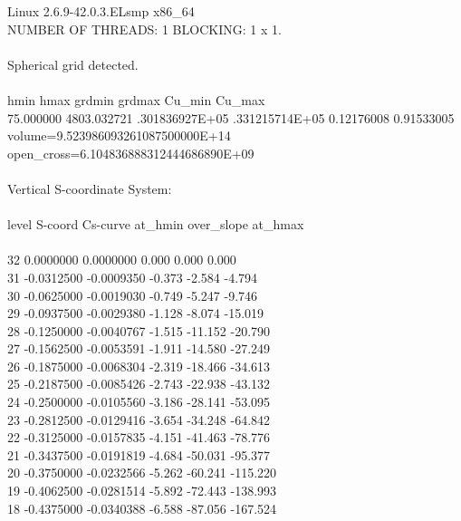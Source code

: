\noindent Linux 2.6.9-42.0.3.ELsmp x86\_64\\
NUMBER OF THREADS:  1 BLOCKING:  1 x  1.\\
\\
Spherical grid detected.\\
\\
hmin        hmax         grdmin         grdmax         Cu\_min      Cu\_max\\
75.000000  4803.032721 .301836927E+05 .331215714E+05  0.12176008  0.91533005\\
volume=9.523986093261087500000E+14   open\_cross=6.104836888312444686890E+09\\
\\
Vertical S-coordinate System:\\
\\
level   S-coord     Cs-curve          at\_hmin  over\_slope     at\_hmax\\
\\
32   0.0000000   0.0000000           0.000       0.000       0.000\\
31  -0.0312500  -0.0009350          -0.373      -2.584      -4.794\\
30  -0.0625000  -0.0019030          -0.749      -5.247      -9.746\\
29  -0.0937500  -0.0029380          -1.128      -8.074     -15.019\\
28  -0.1250000  -0.0040767          -1.515     -11.152     -20.790\\
27  -0.1562500  -0.0053591          -1.911     -14.580     -27.249\\
26  -0.1875000  -0.0068304          -2.319     -18.466     -34.613\\
25  -0.2187500  -0.0085426          -2.743     -22.938     -43.132\\
24  -0.2500000  -0.0105560          -3.186     -28.141     -53.095\\
23  -0.2812500  -0.0129416          -3.654     -34.248     -64.842\\
22  -0.3125000  -0.0157835          -4.151     -41.463     -78.776\\
21  -0.3437500  -0.0191819          -4.684     -50.031     -95.377\\
20  -0.3750000  -0.0232566          -5.262     -60.241    -115.220\\
19  -0.4062500  -0.0281514          -5.892     -72.443    -138.993\\
18  -0.4375000  -0.0340388          -6.588     -87.056    -167.524\\
